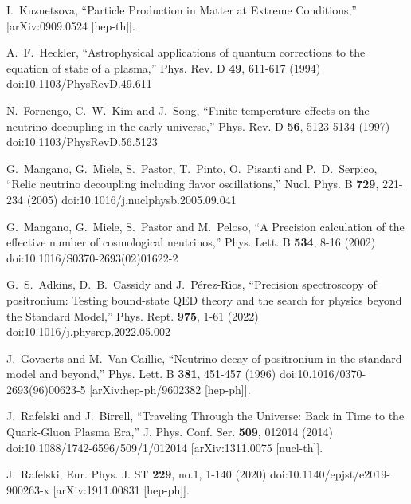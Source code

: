 \documentclass[universe,article,submit,moreauthors,pdftex,a4paper]{Definitions/mdpi}
\begin{document}
\begin{thebibliography}{99}
I.~Kuznetsova,
``Particle Production in Matter at Extreme Conditions,''
[arXiv:0909.0524 [hep-th]].

A.~F.~Heckler,
``Astrophysical applications of quantum corrections to the equation of state of a plasma,''
Phys. Rev. D \textbf{49}, 611-617 (1994)
doi:10.1103/PhysRevD.49.611

N.~Fornengo, C.~W.~Kim and J.~Song,
``Finite temperature effects on the neutrino decoupling in the early universe,''
Phys. Rev. D \textbf{56}, 5123-5134 (1997)
doi:10.1103/PhysRevD.56.5123

G.~Mangano, G.~Miele, S.~Pastor, T.~Pinto, O.~Pisanti and P.~D.~Serpico,
``Relic neutrino decoupling including flavor oscillations,''
Nucl. Phys. B \textbf{729}, 221-234 (2005)
doi:10.1016/j.nuclphysb.2005.09.041

G.~Mangano, G.~Miele, S.~Pastor and M.~Peloso,
``A Precision calculation of the effective number of cosmological neutrinos,''
Phys. Lett. B \textbf{534}, 8-16 (2002)
doi:10.1016/S0370-2693(02)01622-2

G.~S.~Adkins, D.~B.~Cassidy and J.~P\'erez-R\'\i{}os,
``Precision spectroscopy of positronium: Testing bound-state QED theory and the search for physics beyond the Standard Model,''
Phys. Rept. \textbf{975}, 1-61 (2022)
doi:10.1016/j.physrep.2022.05.002

J.~Govaerts and M.~Van Caillie,
``Neutrino decay of positronium in the standard model and beyond,''
Phys. Lett. B \textbf{381}, 451-457 (1996)
doi:10.1016/0370-2693(96)00623-5
[arXiv:hep-ph/9602382 [hep-ph]].

J.~Rafelski and J.~Birrell,
``Traveling Through the Universe: Back in Time to the Quark-Gluon Plasma Era,''
J. Phys. Conf. Ser. \textbf{509}, 012014 (2014)
doi:10.1088/1742-6596/509/1/012014
[arXiv:1311.0075 [nucl-th]].

J.~Rafelski,
Eur. Phys. J. ST \textbf{229}, no.1, 1-140 (2020)
doi:10.1140/epjst/e2019-900263-x
[arXiv:1911.00831 [hep-ph]].


\end{thebibliography}
\end{document}
